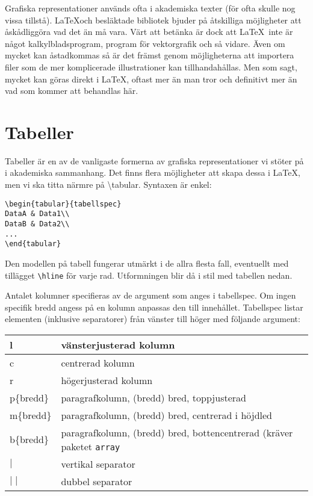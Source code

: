 Grafiska representationer används ofta i akademiska texter (för ofta skulle nog vissa tillstå). \LaTeX och besläktade bibliotek bjuder på åtskilliga möjligheter att åskådliggöra vad det än må vara. Värt att betänka är dock att \LaTeX\ inte är något kalkylbladsprogram, program för vektorgrafik och så vidare. Även om mycket kan åstadkommas så är det främst genom möjligheterna att importera filer som de mer komplicerade illustrationer kan tillhandahållas. Men som sagt, mycket kan göras direkt i \LaTeX, oftast mer än man tror och definitivt mer än vad som kommer att behandlas här.

\section{Tabeller}
Tabeller är en av de vanligaste formerna av grafiska representationer vi stöter på i akademiska sammanhang. Det finns flera möjligheter att skapa dessa i \LaTeX, men vi ska titta närmre på \textbackslash tabular. Syntaxen är enkel:

\begin{verbatim}
\begin{tabular}{tabellspec}
DataA & Data1\\
DataB & Data2\\
...
\end{tabular}
\end{verbatim}

Den modellen på tabell fungerar utmärkt i de allra flesta fall, eventuellt med tillägget \verb=\hline= för varje rad. Utformningen blir då i stil med tabellen nedan.

Antalet kolumner specifieras av de argument som anges i tabellspec. Om ingen specifik bredd angess på en kolumn anpassas den till innehållet. Tabellspec listar elementen (inklusive separatorer) från vänster till höger med följande argument:

\begin{tabular}{|l|p{13.5cm}|}
  \hline
  l & vänsterjusterad kolumn \\\hline
  c & centrerad kolumn \\\hline
  r & högerjusterad kolumn\\\hline
  p\{bredd\} & paragrafkolumn, (bredd) bred, toppjusterad\\\hline
  m\{bredd\} & paragrafkolumn, (bredd) bred, centrerad i höjdled\\\hline
  b\{bredd\} & paragrafkolumn, (bredd) bred, bottencentrerad (kräver paketet \texttt{array}\\\hline
  $\mid$ & vertikal separator\\\hline
  $\mid\mid$ & dubbel separator\\\hline
\end{tabular}

